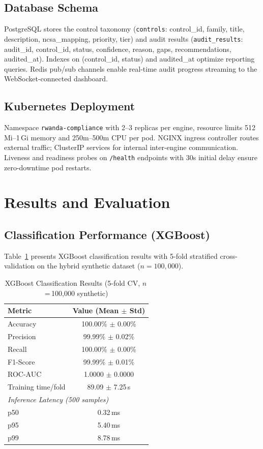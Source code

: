 \documentclass[11pt,conference]{IEEEtran}
\begin{document}
\subsection{Database Schema}

PostgreSQL stores the control taxonomy (\texttt{controls}: control\_id, family, title, description, ncsa\_mapping, priority, tier) and audit results (\texttt{audit\_results}: audit\_id, control\_id, status, confidence, reason, gaps, recommendations, audited\_at). Indexes on (control\_id, status) and audited\_at optimize reporting queries. Redis pub/sub channels enable real-time audit progress streaming to the WebSocket-connected dashboard.

\subsection{Kubernetes Deployment}

Namespace \texttt{rwanda-compliance} with 2--3 replicas per engine, resource limits 512\,Mi--1\,Gi memory and 250m--500m CPU per pod. NGINX ingress controller routes external traffic; ClusterIP services for internal inter-engine communication. Liveness and readiness probes on \texttt{/health} endpoints with 30s initial delay ensure zero-downtime pod restarts.

\section{Results and Evaluation}

\subsection{Classification Performance (XGBoost)}

Table~\ref{tab:results} presents XGBoost classification results with 5-fold stratified cross-validation on the hybrid synthetic dataset ($n=100,000$).

\begin{table}[!t]
\centering
\caption{XGBoost Classification Results (5-fold CV, $n$\,=\,100,000 synthetic)}
\label{tab:results}
\begin{tabular}{@{}lc@{}}
\toprule
\textbf{Metric} & \textbf{Value (Mean $\pm$ Std)} \\
\midrule
Accuracy & 100.00\% $\pm$ 0.00\% \\
Precision & 99.99\% $\pm$ 0.02\% \\
Recall & 100.00\% $\pm$ 0.00\% \\
F1-Score & 99.99\% $\pm$ 0.01\% \\
ROC-AUC & 1.0000 $\pm$ 0.0000 \\
Training time/fold & 89.09 $\pm$ 7.25\,s \\
\midrule
\multicolumn{2}{l}{\textit{Inference Latency (500 samples)}} \\
p50 & 0.32\,ms \\
p95 & 5.40\,ms \\
p99 & 8.78\,ms \\
\bottomrule
\end{tabular}
\end{table}
\end{document}
